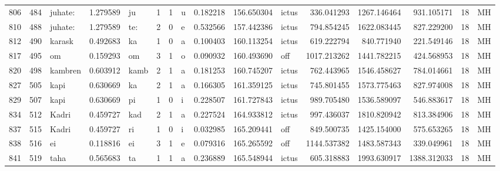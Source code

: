 \begin{tabular}{lrlrllllrrlrrrll}
806  &         484 &          juhate: &  1.279589 &      ju &        1 &      1 &       u &      0.182218 &    156.650304 &  ictus &   336.041293 &  1267.146464 &   931.105171 &     18 &        MH \\
810  &         488 &          juhate: &  1.279589 &     te: &        2 &      0 &       e &      0.532566 &    157.442386 &  ictus &   794.854245 &  1622.083445 &   827.229200 &     18 &        MH \\
812  &         490 &           karask &  0.492683 &      ka &        1 &      0 &       a &      0.100403 &    160.113254 &  ictus &   619.222794 &   840.771940 &   221.549146 &     18 &        MH \\
817  &         495 &               om &  0.159293 &      om &        3 &      1 &       o &      0.090932 &    160.493690 &    off &  1017.213262 &  1441.782215 &   424.568953 &     18 &        MH \\
820  &         498 &          kambren &  0.603912 &    kamb &        2 &      1 &       a &      0.181253 &    160.745207 &  ictus &   762.443965 &  1546.458627 &   784.014661 &     18 &        MH \\
827  &         505 &             kapi &  0.630669 &      ka &        2 &      1 &       a &      0.166305 &    161.359125 &  ictus &   745.801455 &  1573.775463 &   827.974008 &     18 &        MH \\
829  &         507 &             kapi &  0.630669 &      pi &        1 &      0 &       i &      0.228507 &    161.727843 &  ictus &   989.705480 &  1536.589097 &   546.883617 &     18 &        MH \\
834  &         512 &            Kadri &  0.459727 &     kad &        2 &      1 &       a &      0.227524 &    164.933812 &  ictus &   997.436037 &  1810.820942 &   813.384906 &     18 &        MH \\
837  &         515 &            Kadri &  0.459727 &      ri &        1 &      0 &       i &      0.032985 &    165.209441 &    off &   849.500735 &  1425.154000 &   575.653265 &     18 &        MH \\
838  &         516 &               ei &  0.118816 &      ei &        3 &      1 &       e &      0.079316 &    165.265592 &    off &  1144.537382 &  1483.587343 &   339.049961 &     18 &        MH \\
841  &         519 &             taha &  0.565683 &      ta &        1 &      1 &       a &      0.236889 &    165.548944 &  ictus &   605.318883 &  1993.630917 &  1388.312033 &     18 &        MH \\

\end{tabular}
